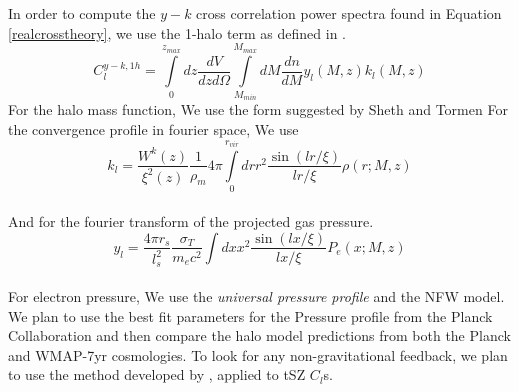In order to compute the $y - k$ cross correlation power spectra found in Equation
\ref{realcrosstheory}, we use the 1-halo term as defined in \cite{haloreview}.
\begin{equation}
  C_l^{y-k,1h} = \int\limits_0^{z_{max}} dz \frac{dV}{dz d\Omega} \int\limits_{M_{min}}^{M_{max}} dM \frac{dn}{dM} y_l (M, z) k_l (M,z)
 \end{equation}
 For the halo mass function, We use the form suggested by Sheth and Tormen \cite{massfunctionsheth}
 For the convergence profile in fourier space, We use
 \begin{equation}
   k_l = \frac{W^k(z)}{\xi^2(z)} \frac{1}{\rho_m} 4 \pi \int\limits_0 ^{r_{vir}} dr r^2 \frac{\sin(lr/\xi)}{lr/\xi} \rho(r;M,z)
 \end{equation}
   \\
   And for the fourier transform of the projected gas pressure.
   \begin{equation}
     y_l = \frac{4 \pi r_s}{l^2_s} \frac{\sigma_T}{m_e c^2} \int dx x^2  \frac{\sin(lx/\xi)}{lx/\xi} P_e(x;M,z)
    \end{equation}
\\
For electron pressure, We use the \emph{universal pressure profile} and the NFW model. 
We plan to use the best fit parameters for the Pressure profile from the Planck Collaboration
and then compare the halo model predictions from both the Planck and WMAP-7yr cosmologies. To look
for any non-gravitational feedback, we plan to use the method developed by \cite{subhapaper},
applied to tSZ $C_l$s.

